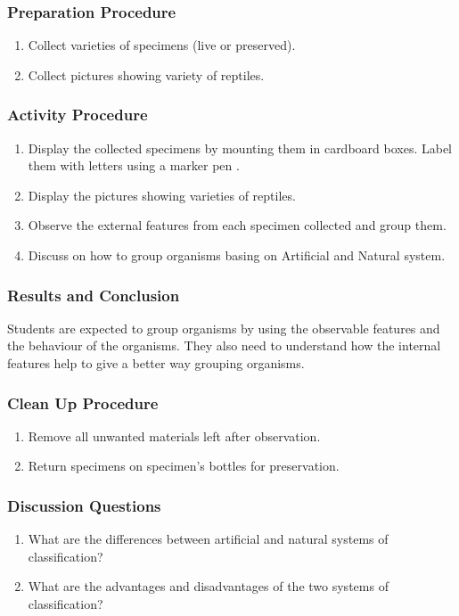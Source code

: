 \subsubsection*{Preparation Procedure}
\begin{enumerate}
\item{Collect varieties of specimens (live or preserved).}
\item{Collect pictures showing variety of reptiles.}
\end{enumerate}

\subsubsection*{Activity Procedure}
\begin{enumerate}
\item{Display the collected specimens by mounting them in cardboard boxes. Label them with letters using a marker pen .}
\item{Display the pictures showing varieties of reptiles.}
\item{Observe the external features from each specimen collected and group them.}
\item{Discuss on how to group organisms basing on Artificial and Natural system.}
\end{enumerate}

\subsubsection*{Results and Conclusion}
Students are expected to group organisms by using the observable features and the behaviour of the organisms. They also need to understand how the internal features help to give a better way grouping organisms.

\subsubsection*{Clean Up Procedure}
\begin{enumerate}
\item{Remove all unwanted materials left after observation.}
\item{Return specimens on specimen's bottles for preservation.}
\end{enumerate}

\subsubsection*{Discussion Questions}
\begin{enumerate}
\item{What are the differences between artificial and natural systems of classification?}
\item{What are the advantages and disadvantages of the two systems of classification?}
\end{enumerate}

